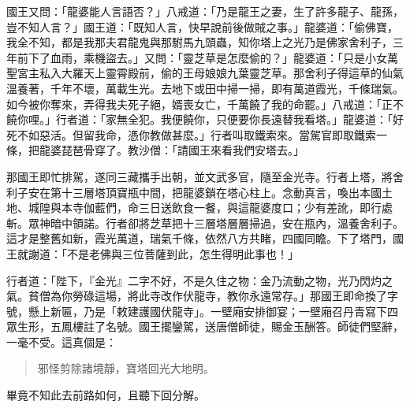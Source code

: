 國王又問：「龍婆能人言語否？」八戒道：「乃是龍王之妻，生了許多龍子、龍孫，豈不知人言？」國王道：「既知人言，快早說前後做賊之事。」龍婆道：「偷佛寶，我全不知，都是我那夫君龍鬼與那駙馬九頭蟲，知你塔上之光乃是佛家舍利子，三年前下了血雨，乘機盜去。」又問：「靈芝草是怎麼偷的？」龍婆道：「只是小女萬聖宮主私入大羅天上靈霄殿前，偷的王母娘娘九葉靈芝草。那舍利子得這草的仙氣溫養著，千年不壞，萬載生光。去地下或田中掃一掃，即有萬道霞光，千條瑞氣。如今被你奪來，弄得我夫死子絕，婿喪女亡，千萬饒了我的命罷。」八戒道：「正不饒你哩。」行者道：「家無全犯。我便饒你，只便要你長遠替我看塔。」龍婆道：「好死不如惡活。但留我命，憑你教做甚麼。」行者叫取鐵索來。當駕官即取鐵索一條，把龍婆琵琶骨穿了。教沙僧：「請國王來看我們安塔去。」

那國王即忙排駕，遂同三藏攜手出朝，並文武多官，隨至金光寺。行者上塔，將舍利子安在第十三層塔頂寶瓶中間，把龍婆鎖在塔心柱上。念動真言，喚出本國土地、城隍與本寺伽藍們，命三日送飲食一餐，與這龍婆度口；少有差訛，即行處斬。眾神暗中領諾。行者卻將芝草把十三層塔層層掃過，安在瓶內，溫養舍利子。這才是整舊如新，霞光萬道，瑞氣千條，依然八方共睹，四國同瞻。下了塔門，國王就謝道：「不是老佛與三位菩薩到此，怎生得明此事也！」

行者道：「陛下，『金光』二字不好，不是久住之物：金乃流動之物，光乃閃灼之氣。貧僧為你勞碌這場，將此寺改作伏龍寺，教你永遠常存。」那國王即命換了字號，懸上新匾，乃是「敕建護國伏龍寺」。一壁廂安排御宴；一壁廂召丹青寫下四眾生形，五鳳樓註了名號。國王擺鑾駕，送唐僧師徒，賜金玉酬答。師徒們堅辭，一毫不受。這真個是：
\begin{quote}
邪怪剪除諸境靜，寶塔回光大地明。
\end{quote}

畢竟不知此去前路如何，且聽下回分解。
